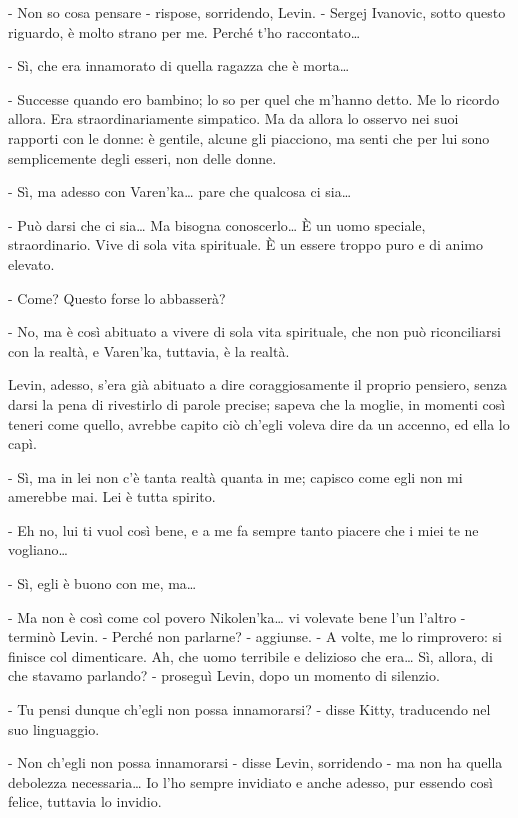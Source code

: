 - Non so cosa pensare - rispose, sorridendo, Levin. - Sergej Ivanovic, sotto questo riguardo, è molto strano per me. Perché t'ho raccontato\ldots{} 

- Sì, che era innamorato di quella ragazza che è morta\ldots{} 

- Successe quando ero bambino; lo so per quel che m'hanno detto. Me lo ricordo allora. Era straordinariamente simpatico. Ma da allora lo osservo nei suoi rapporti con le donne: è gentile, alcune gli piacciono, ma senti che per lui sono semplicemente degli esseri, non delle donne. 

- Sì, ma adesso con Varen'ka\ldots{} pare che qualcosa ci sia\ldots{} 

- Può darsi che ci sia\ldots{} Ma bisogna conoscerlo\ldots{} È un uomo speciale, straordinario. Vive di sola vita spirituale. È un essere troppo puro e di animo elevato. 

- Come? Questo forse lo abbasserà? 

- No, ma è così abituato a vivere di sola vita spirituale, che non può riconciliarsi con la realtà, e Varen'ka, tuttavia, è la realtà. 

Levin, adesso, s'era già abituato a dire coraggiosamente il proprio pensiero, senza darsi la pena di rivestirlo di parole precise; sapeva che la moglie, in momenti così teneri come quello, avrebbe capito ciò ch'egli voleva dire da un accenno, ed ella lo capì. 

- Sì, ma in lei non c'è tanta realtà quanta in me; capisco come egli non mi amerebbe mai. Lei è tutta spirito. 

- Eh no, lui ti vuol così bene, e a me fa sempre tanto piacere che i miei te ne vogliano\ldots{} 

- Sì, egli è buono con me, ma\ldots{} 

- Ma non è così come col povero Nikolen'ka\ldots{} vi volevate bene l'un l'altro - terminò Levin. - Perché non parlarne? - aggiunse. - A volte, me lo rimprovero: si finisce col dimenticare. Ah, che uomo terribile e delizioso che era\ldots{} Sì, allora, di che stavamo parlando? - proseguì Levin, dopo un momento di silenzio. 

- Tu pensi dunque ch'egli non possa innamorarsi? - disse Kitty, traducendo nel suo linguaggio. 

- Non ch'egli non possa innamorarsi - disse Levin, sorridendo - ma non ha quella debolezza necessaria\ldots{} Io l'ho sempre invidiato e anche adesso, pur essendo così felice, tuttavia lo invidio. 

